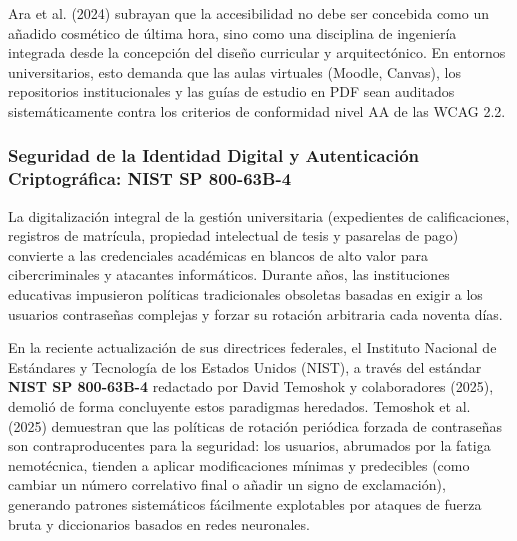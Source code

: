 Ara et al. (2024) subrayan que la accesibilidad no debe ser concebida como un añadido cosmético de última hora, sino como una disciplina de ingeniería integrada desde la concepción del diseño curricular y arquitectónico. En entornos universitarios, esto demanda que las aulas virtuales (Moodle, Canvas), los repositorios institucionales y las guías de estudio en PDF sean auditados sistemáticamente contra los criterios de conformidad nivel AA de las WCAG 2.2.

\subsubsection{Seguridad de la Identidad Digital y Autenticación Criptográfica: NIST SP 800-63B-4}

La digitalización integral de la gestión universitaria (expedientes de calificaciones, registros de matrícula, propiedad intelectual de tesis y pasarelas de pago) convierte a las credenciales académicas en blancos de alto valor para cibercriminales y atacantes informáticos. Durante años, las instituciones educativas impusieron políticas tradicionales obsoletas basadas en exigir a los usuarios contraseñas complejas y forzar su rotación arbitraria cada noventa días.

En la reciente actualización de sus directrices federales, el Instituto Nacional de Estándares y Tecnología de los Estados Unidos (NIST), a través del estándar \textbf{NIST SP 800-63B-4} redactado por David Temoshok y colaboradores (2025), demolió de forma concluyente estos paradigmas heredados. Temoshok et al. (2025) demuestran que las políticas de rotación periódica forzada de contraseñas son contraproducentes para la seguridad: los usuarios, abrumados por la fatiga nemotécnica, tienden a aplicar modificaciones mínimas y predecibles (como cambiar un número correlativo final o añadir un signo de exclamación), generando patrones sistemáticos fácilmente explotables por ataques de fuerza bruta y diccionarios basados en redes neuronales.

